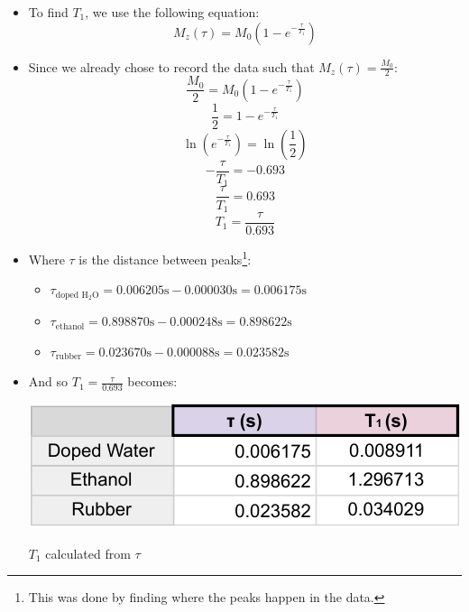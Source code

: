 \documentclass{article}
\begin{document}
\begin{itemize}
    \item To find $T_1$, we use the following equation:
    \[ M_z(\tau) = M_0 \left( 1 - e^{-\frac{\tau}{T_1}} \right) \]
    \item Since we already chose to record the data such that $M_z(\tau) = \frac{M_0}{2}$:
    \[ \frac{M_0}{2} = M_0 \left( 1 - e^{-\frac{\tau}{T_1}} \right) \]
    \[ \frac{1}{2} = 1 - e^{-\frac{\tau}{T_1}} \]
    \[ \ln \left( e^{-\frac{\tau}{T_1}} \right) = \ln \left( \frac{1}{2} \right) \]
    \[ -\frac{\tau}{T_1} = -0.693 \]
    \[ \frac{\tau}{T_1} = 0.693 \]
    \[ T_1 = \frac{\tau}{0.693} \]
    \item Where $\tau$ is the distance between peaks\footnote{This was done by finding where the peaks happen in the data.}:
    \begin{itemize}
        \item $\tau_{\text{doped H$_2$O}} = 0.006205\text{s} - 0.000030\text{s} = 0.006175\text{s}$
        \item $\tau_{\text{ethanol}} = 0.898870\text{s} - 0.000248\text{s} = 0.898622\text{s}$
        \item $\tau_{\text{rubber}} = 0.023670\text{s} - 0.000088\text{s} = 0.023582\text{s}$
    \end{itemize}
    \item And so $T_1 = \frac{\tau}{0.693}$ becomes:
    \begin{table}[h]
        \centering
        \includegraphics[scale = 0.78]{../images/B3_T1-crop}
        \caption{$T_1$ calculated from $\tau$}
        \label{tab:T1_table}
    \end{table}
\end{itemize}
\end{document}
